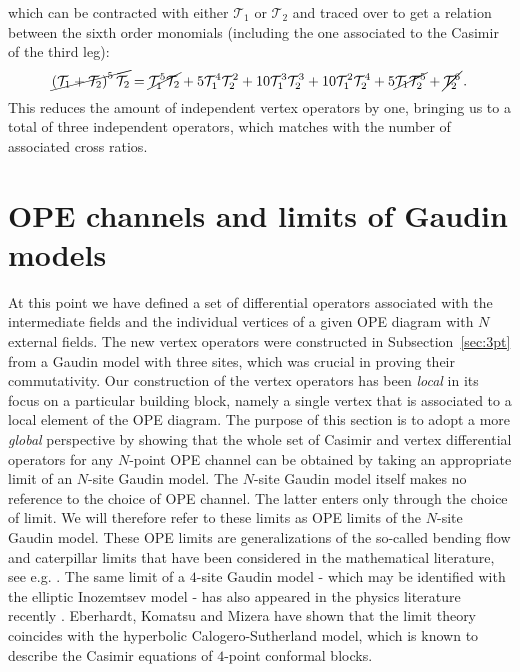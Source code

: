\documentclass{article}
\begin{document}
which can be contracted with either $\mathcal{T}_{1}$ or $\mathcal{T}_{2}$ and 
traced over to get a relation between the sixth order monomials (including 
the one associated to the Casimir of the third leg):
\begin{equation}
    \cancel{\left(\mathcal{T}_{1}+\mathcal{T}_{2} \right)^{5}\mathcal{T}_{2}}=
    \cancel{\mathcal{T}_{1}^5\mathcal{T}_{2}}+
    5\mathcal{T}_{1}^4\mathcal{T}_{2}^2+10\mathcal{T}_{1}^3\mathcal{T}_{2}^3+
    10\mathcal{T}_{1}^2\mathcal{T}_{2}^4+5\cancel{\mathcal{T}_{1}\mathcal{T}_{2}^5}+
    \cancel{\mathcal{T}_{2}^6}\,.
\end{equation}
This reduces the amount of independent vertex operators by one, bringing us to a total 
of three independent operators, which matches with the number of associated cross 
ratios.


\section{OPE channels and limits of Gaudin models}
\label{sec:GaudinOPE}
 
At this point we have defined a set of differential operators associated with the intermediate 
fields and the individual vertices of a given OPE diagram with $N$ external fields. The new vertex operators were constructed in Subsection~\ref{sec:3pt} from a Gaudin model with three sites, which was crucial in proving their commutativity. Our construction of the vertex 
operators has been \textit{local} in its focus on a particular building block, 
namely a single vertex that is associated to a local element of the OPE diagram. The purpose 
of this section is to adopt a more \textit{global} perspective by showing that the whole set of Casimir and vertex differential operators for any $N$-point OPE channel can be obtained by taking an appropriate limit of an $N$-site Gaudin model. The
$N$-site Gaudin model itself makes no reference to the choice of OPE channel. The latter enters only 
through the choice of limit. We will therefore refer to these limits as OPE limits of 
the $N$-site Gaudin model. These OPE limits are generalizations of the so-called bending flow 
and caterpillar limits that have been considered in the mathematical literature, see e.g. 
\cite{Chervov:2007dn,Chervov:2009,rybnikov2016cactus}. The same limit of a $4$-site Gaudin 
model - which may be identified with the elliptic Inozemtsev model \cite{Argyres:2021iws} -  
has also appeared in the physics literature recently \cite{Eberhardt:2020ewh}. 
Eberhardt, Komatsu and Mizera have shown that the limit theory coincides with the hyperbolic Calogero-Sutherland model, which is known to describe the Casimir equations of 
$4$-point conformal blocks. 
\end{document}
